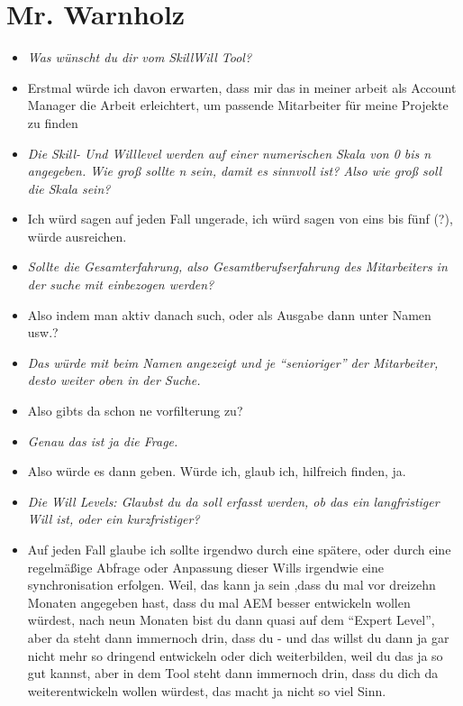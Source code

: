 \section{Mr. Warnholz}
\begin{itemize}
\item[] \textit{Was wünscht du dir vom SkillWill Tool?}
\item[] Erstmal würde ich davon erwarten, dass mir das in meiner arbeit als Account Manager die Arbeit erleichtert, um passende Mitarbeiter für meine Projekte zu finden

\item[] \textit{Die Skill- Und Willlevel werden auf einer numerischen Skala von 0 bis n angegeben. Wie groß sollte n sein, damit es sinnvoll ist? Also wie groß soll die Skala sein?}
\item[] Ich würd sagen auf jeden Fall ungerade, ich würd sagen von eins bis fünf (?), würde ausreichen.

\item[] \textit{Sollte die Gesamterfahrung, also Gesamtberufserfahrung des Mitarbeiters in der suche mit einbezogen werden?}
\item[] Also indem man aktiv danach such, oder als Ausgabe dann unter Namen usw.?

\item[] \textit{Das würde mit beim Namen angezeigt und je “senioriger” der Mitarbeiter, desto weiter oben in der Suche.}
\item[] Also gibts da schon ne vorfilterung zu?

\item[] \textit{Genau das ist ja die Frage.}
\item[] Also würde es dann geben. Würde ich, glaub ich, hilfreich finden, ja.

\item[] \textit{Die Will Levels: Glaubst du da soll erfasst werden, ob das ein langfristiger Will ist, oder ein kurzfristiger?}
\item[] Auf jeden Fall glaube ich sollte irgendwo durch eine spätere, oder durch eine regelmäßige Abfrage oder Anpassung dieser Wills irgendwie eine synchronisation erfolgen. Weil, das kann ja sein ,dass du mal vor dreizehn Monaten angegeben hast, dass du mal AEM besser entwickeln wollen würdest, nach neun Monaten bist du dann quasi auf dem “Expert Level”, aber da steht dann immernoch drin, dass du - und das willst du dann ja gar nicht mehr so dringend entwickeln oder dich weiterbilden, weil du das ja so gut kannst, aber in dem Tool steht dann immernoch drin, dass du dich da weiterentwickeln wollen würdest, das macht ja nicht so viel Sinn.


\end{itemize}
